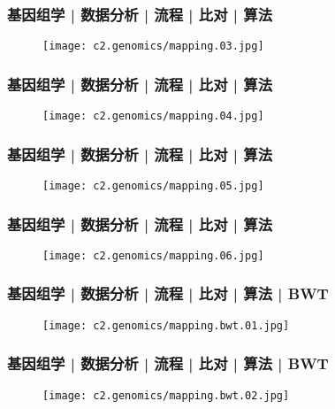 \begin{frame}
  \frametitle{基因组学 | 数据分析 | 流程 | 比对 | 算法}
  \begin{figure}
    \centering
    \texttt{[image: c2.genomics/mapping.03.jpg]}
  \end{figure}
\end{frame}

\begin{frame}
  \frametitle{基因组学 | 数据分析 | 流程 | 比对 | 算法}
  \begin{figure}
    \centering
    \texttt{[image: c2.genomics/mapping.04.jpg]}
  \end{figure}
\end{frame}

\begin{frame}
  \frametitle{基因组学 | 数据分析 | 流程 | 比对 | 算法}
  \begin{figure}
    \centering
    \texttt{[image: c2.genomics/mapping.05.jpg]}
  \end{figure}
\end{frame}

\begin{frame}
  \frametitle{基因组学 | 数据分析 | 流程 | 比对 | 算法}
  \begin{figure}
    \centering
    \texttt{[image: c2.genomics/mapping.06.jpg]}
  \end{figure}
\end{frame}

\begin{frame}
  \frametitle{基因组学 | 数据分析 | 流程 | 比对 | 算法 | BWT}
  \begin{figure}
    \centering
    \texttt{[image: c2.genomics/mapping.bwt.01.jpg]}
  \end{figure}
\end{frame}

\begin{frame}
  \frametitle{基因组学 | 数据分析 | 流程 | 比对 | 算法 | BWT}
  \begin{figure}
    \centering
    \texttt{[image: c2.genomics/mapping.bwt.02.jpg]}
  \end{figure}
\end{frame}

